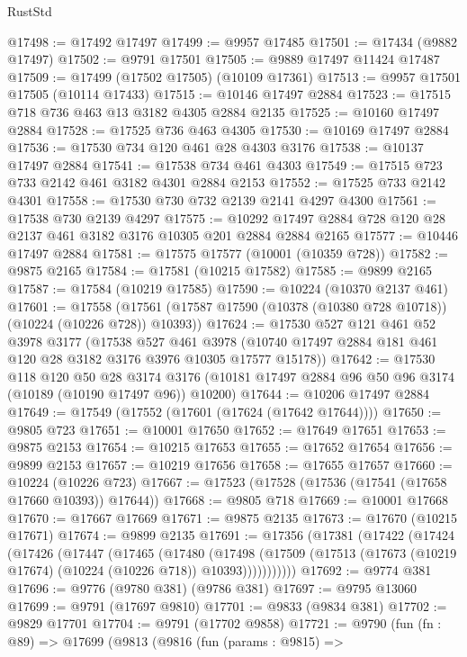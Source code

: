 \begin{lexlean}{RustStd}
\begin{coremodule}
@17498 := @17492 @17497
@17499 := @9957 @17485
@17501 := @17434 (@9882 @17497)
@17502 := @9791 @17501
@17505 := @9889 @17497 @11424 @17487
@17509 := @17499 (@17502 @17505) (@10109 @17361)
@17513 := @9957 @17501 @17505 (@10114 @17433)
@17515 := @10146 @17497 @2884
@17523 := @17515 @718 @736 @463 @13 @3182 @4305 @2884 @2135
@17525 := @10160 @17497 @2884
@17528 := @17525 @736 @463 @4305
@17530 := @10169 @17497 @2884
@17536 := @17530 @734 @120 @461 @28 @4303 @3176
@17538 := @10137 @17497 @2884
@17541 := @17538 @734 @461 @4303
@17549 := @17515 @723 @733 @2142 @461 @3182 @4301 @2884 @2153
@17552 := @17525 @733 @2142 @4301
@17558 := @17530 @730 @732 @2139 @2141 @4297 @4300
@17561 := @17538 @730 @2139 @4297
@17575 := @10292 @17497 @2884 @728 @120 @28 @2137 @461 @3182 @3176 @10305 @201 @2884 @2884 @2165
@17577 := @10446 @17497 @2884
@17581 := @17575 @17577 (@10001 (@10359 @728))
@17582 := @9875 @2165
@17584 := @17581 (@10215 @17582)
@17585 := @9899 @2165
@17587 := @17584 (@10219 @17585)
@17590 := @10224 (@10370 @2137 @461)
@17601 := @17558
    (@17561 (@17587 @17590 (@10378 (@10380 @728 @10718)) (@10224 (@10226 @728)) @10393))
@17624 := @17530
    @527
    @121
    @461
    @52
    @3978
    @3177
    (@17538
      @527
      @461
      @3978
      (@10740 @17497 @2884 @181 @461 @120 @28 @3182 @3176 @3976 @10305 @17577 @15178))
@17642 := @17530
    @118
    @120
    @50
    @28
    @3174
    @3176
    (@10181 @17497 @2884 @96 @50 @96 @3174 (@10189 (@10190 @17497 @96)) @10200)
@17644 := @10206 @17497 @2884
@17649 := @17549 (@17552 (@17601 (@17624 (@17642 @17644))))
@17650 := @9805 @723
@17651 := @10001 @17650
@17652 := @17649 @17651
@17653 := @9875 @2153
@17654 := @10215 @17653
@17655 := @17652 @17654
@17656 := @9899 @2153
@17657 := @10219 @17656
@17658 := @17655 @17657
@17660 := @10224 (@10226 @723)
@17667 := @17523 (@17528 (@17536 (@17541 (@17658 @17660 @10393)) @17644))
@17668 := @9805 @718
@17669 := @10001 @17668
@17670 := @17667 @17669
@17671 := @9875 @2135
@17673 := @17670 (@10215 @17671)
@17674 := @9899 @2135
@17691 := @17356
    (@17381
      (@17422
        (@17424
          (@17426
            (@17447
              (@17465
                (@17480
                  (@17498
                    (@17509 (@17513 (@17673 (@10219 @17674) (@10224 (@10226 @718)) @10393)))))))))))
@17692 := @9774 @381
@17696 := @9776 (@9780 @381) (@9786 @381)
@17697 := @9795 @13060
@17699 := @9791 (@17697 @9810)
@17701 := @9833 (@9834 @381)
@17702 := @9829 @17701
@17704 := @9791 (@17702 @9858)
@17721 := @9790
    (fun (fn : @89) =>
    @17699
      (@9813
        (@9816
          (fun (params : @9815) =>

\end{coremodule}
\end{lexlean}
